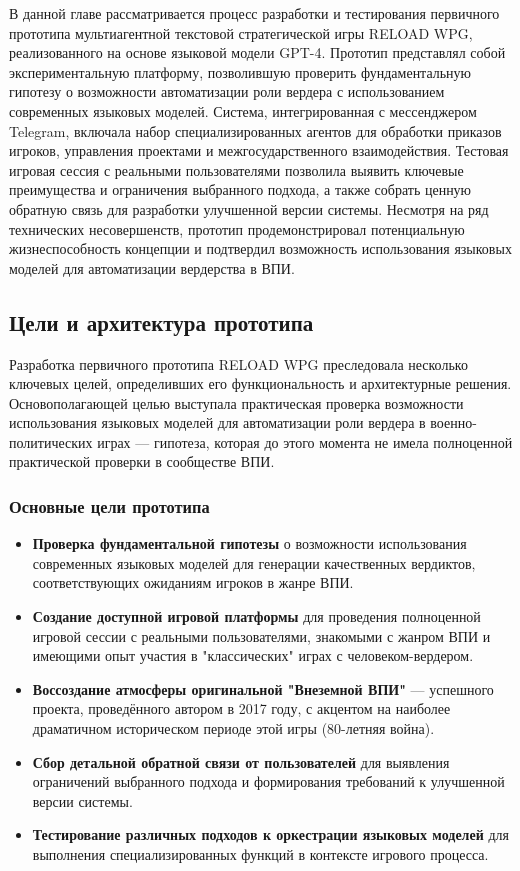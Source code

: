 В данной главе рассматривается процесс разработки и тестирования первичного прототипа мультиагентной текстовой стратегической игры RELOAD WPG, реализованного на основе языковой модели GPT-4. Прототип представлял собой экспериментальную платформу, позволившую проверить фундаментальную гипотезу о возможности автоматизации роли вердера с использованием современных языковых моделей. Система, интегрированная с мессенджером Telegram, включала набор специализированных агентов для обработки приказов игроков, управления проектами и межгосударственного взаимодействия. Тестовая игровая сессия с реальными пользователями позволила выявить ключевые преимущества и ограничения выбранного подхода, а также собрать ценную обратную связь для разработки улучшенной версии системы. Несмотря на ряд технических несовершенств, прототип продемонстрировал потенциальную жизнеспособность концепции и подтвердил возможность использования языковых моделей для автоматизации вердерства в ВПИ.
\subsection{Цели и архитектура прототипа}

Разработка первичного прототипа RELOAD WPG преследовала несколько ключевых целей, определивших его функциональность и архитектурные решения. Основополагающей целью выступала практическая проверка возможности использования языковых моделей для автоматизации роли вердера в военно-политических играх — гипотеза, которая до этого момента не имела полноценной практической проверки в сообществе ВПИ.

\subsubsection{Основные цели прототипа}

\begin{itemize}
    \item \textbf{Проверка фундаментальной гипотезы} о возможности использования современных языковых моделей для генерации качественных вердиктов, соответствующих ожиданиям игроков в жанре ВПИ.

    \item \textbf{Создание доступной игровой платформы} для проведения полноценной игровой сессии с реальными пользователями, знакомыми с жанром ВПИ и имеющими опыт участия в "классических" играх с человеком-вердером.

    \item \textbf{Воссоздание атмосферы оригинальной "Внеземной ВПИ"} — успешного проекта, проведённого автором в 2017 году, с акцентом на наиболее драматичном историческом периоде этой игры (80-летняя война).

    \item \textbf{Сбор детальной обратной связи от пользователей} для выявления ограничений выбранного подхода и формирования требований к улучшенной версии системы.

    \item \textbf{Тестирование различных подходов к оркестрации языковых моделей} для выполнения специализированных функций в контексте игрового процесса.
\end{itemize}


